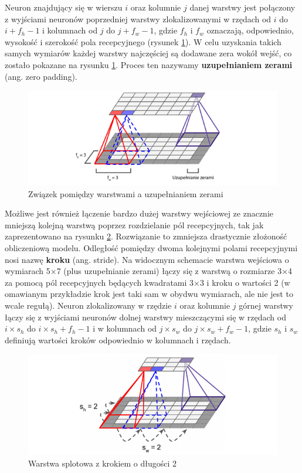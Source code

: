 \documentclass[12pt]{mwbk}
\theoremstyle{plain}
\theoremstyle{definition}
\theoremstyle{remark}
\newcommand\zrodlo[1]{\par\vspace{-3mm}{\small\textit{Źródło: }#1 }}
\begin{document}
Neuron znajdujący się w wierszu $i$ oraz kolumnie $j$ danej warstwy jest połączony z wyjściami neuronów poprzedniej warstwy zlokalizowanymi w rzędach od $i$ do $i+f_h -1$ i kolumnach od $j$ do $j+f_w -1$,
gdzie $f_h$ i $f_w$ oznaczają, odpowiednio, wysokość i szerokość pola recepcyjnego (rysunek \ref{fig:zero-padding}). W celu
uzyskania takich samych wymiarów każdej warstwy najczęściej są dodawane zera wokół wejść, co zostało pokazane na rysunku \ref{fig:zero-padding}. Proces ten nazywamy \textbf{uzupełnianiem zerami} (ang. zero padding).

\begin{figure}[!h]
	\centering
	\includegraphics[width=\linewidth]{rys/zero_padding.png}
	\caption{Związek pomiędzy warstwami a uzupełnianiem zerami}
	\zrodlo{\cite{geron}}
	\label{fig:zero-padding}
\end{figure}

Możliwe jest również łączenie bardzo dużej warstwy wejściowej ze znacznie mniejszą kolejną warstwą
poprzez rozdzielanie pól recepcyjnych, tak jak zaprezentowano na rysunku \ref{fig:stride}. Rozwiązanie to
zmniejsza drastycznie złożoność obliczeniową modelu. Odległość pomiędzy dwoma kolejnymi polami
recepcyjnymi nosi nazwę \textbf{kroku} (ang. stride). Na widocznym schemacie warstwa wejściowa o wymiarach 5×7 (plus uzupełnianie zerami) łączy się z warstwą o rozmiarze 3×4 za pomocą pól recepcyjnych będących kwadratami 3×3 i kroku o wartości 2 (w omawianym przykładzie krok jest taki sam w obydwu wymiarach, ale nie jest to wcale regułą). Neuron zlokalizowany w rzędzie $i$ oraz kolumnie $j$ górnej warstwy łączy się z wyjściami neuronów dolnej warstwy mieszczącymi się w rzędach od $i\times s_h$ do $i\times s_h +f_h -1$ i w kolumnach od $j\times s_w$ do $j \times s_w +f_w -1$, gdzie $s_h$ i $s_w$ definiują wartości kroków odpowiednio w kolumnach i rzędach.


\begin{figure}[!h]
	\centering
	\includegraphics[width=0.9\linewidth]{rys/cnn_stride.png}
	\caption{Warstwa splotowa z krokiem o długości 2}
	\zrodlo{\cite{geron}}
	\label{fig:stride}
\end{figure}
\end{document}
